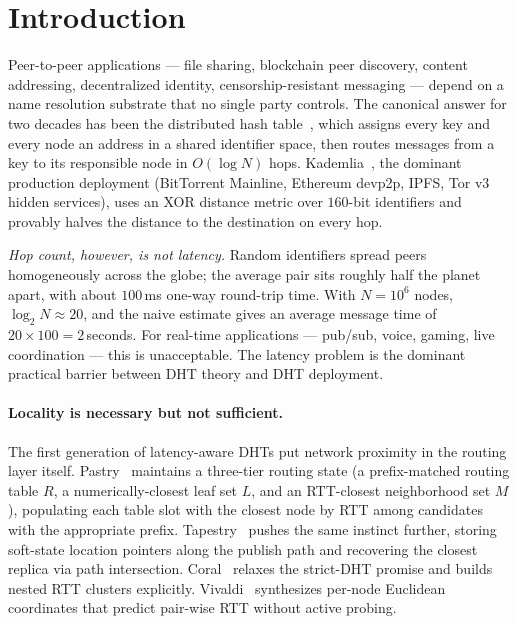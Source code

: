 \documentclass[conference]{IEEEtran}
\begin{document}
\section{Introduction}
\label{sec:intro}

Peer-to-peer applications --- file sharing, blockchain peer discovery, content
addressing, decentralized identity, censorship-resistant messaging --- depend
on a name resolution substrate that no single party controls. The canonical
answer for two decades has been the distributed hash
table~\cite{stoica2001chord,maymounkov2002kademlia,rowstron2001pastry,zhao2004tapestry,ratnasamy2001can},
which assigns every key and every node an address in a shared identifier
space, then routes messages from a key to its responsible node in
$O(\log N)$ hops. Kademlia~\cite{maymounkov2002kademlia}, the dominant
production deployment (BitTorrent Mainline, Ethereum devp2p, IPFS, Tor v3
hidden services), uses an XOR distance metric over $160$-bit identifiers and
provably halves the distance to the destination on every hop.

\emph{Hop count, however, is not latency.} Random identifiers spread peers
homogeneously across the globe; the average pair sits roughly half the planet
apart, with about $100$\,ms one-way round-trip time. With $N = 10^6$ nodes,
$\log_2 N \approx 20$, and the naive estimate gives an average message time
of $20 \times 100 = 2$\,seconds. For real-time applications --- pub/sub,
voice, gaming, live coordination --- this is unacceptable. The latency
problem is the dominant practical barrier between DHT theory and DHT
deployment.

\paragraph{Locality is necessary but not sufficient.}
The first generation of latency-aware DHTs put network proximity in the
routing layer itself. Pastry~\cite{rowstron2001pastry} maintains a three-tier
routing state (a prefix-matched routing table $R$, a numerically-closest leaf
set $L$, and an RTT-closest neighborhood set $M$), populating each table
slot with the closest node by RTT among candidates with the appropriate
prefix. Tapestry~\cite{zhao2004tapestry} pushes the same instinct further,
storing soft-state location pointers along the publish path and recovering
the closest replica via path intersection. Coral~\cite{freedman2004coral}
relaxes the strict-DHT promise and builds nested RTT clusters explicitly.
Vivaldi~\cite{dabek2004vivaldi} synthesizes per-node Euclidean coordinates
that predict pair-wise RTT without active probing.
\end{document}
